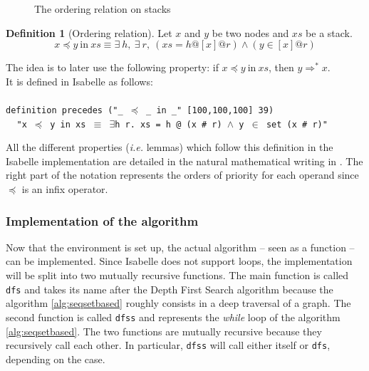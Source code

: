 \documentclass[a4 paper, 12pt]{article}
\newcommand{\where}{{\color{isa_green}{where}}}
\newcommand{\isa}[1]{\small\texttt{\\\noindent#1}}
\theoremstyle{definition}
\newtheorem{definition}{Definition}
\begin{document}
\begin{figure}[!h]
    \caption{The ordering relation on stacks\label{fig:stackorder}}
\end{figure}

\begin{definition}[Ordering relation]
    Let $x$ and $y$ be two nodes and $xs$ be a stack.
    \begin{equation*}
        x \preceq y~\text{in}~xs \equiv \exists~h,~\exists~r,~(xs = h @ [x] @ r) \wedge (y \in [x]@r)
    \end{equation*}
\end{definition}


The idea is to later use the following property: if $x \preceq y~\text{in}~xs$, then $y \Rightarrow^* x$.\\
It is defined in Isabelle as follows:\\
\isa{
    {\color{isa_blue}definition} precedes ("\_ $\preceq$ \_ in \_" [100,100,100] 39) \where\\
$~~~~~$"{\color{isa_dark_green}x} $\preceq$ {\color{isa_dark_green}y} in {\color{isa_dark_green}xs} $\equiv$ $\exists${\color{isa_dark_green}h} {\color{isa_dark_green}r}. {\color{isa_dark_green}xs} = {\color{isa_dark_green}h} @ ({\color{isa_dark_green}x} \# {\color{isa_dark_green}r}) $\wedge$ {\color{isa_dark_green}y} $\in$ set ({\color{isa_dark_green}x} \# {\color{isa_dark_green}r})"\\
}

All the different properties (\textit{i.e.} lemmas) which follow this definition in the Isabelle implementation are detailed in the natural mathematical writing in . The right part of the notation represents the orders of priority for each operand since $\preceq$ is an infix operator.

\subsubsection{Implementation of the algorithm}

Now that the environment is set up, the actual algorithm -- seen as a function -- can be implemented.
Since Isabelle does not support loops, the implementation will be split into two mutually recursive functions. The main function is called \texttt{dfs} and takes its name after the Depth First Search algorithm because the algorithm \ref{alg:seqsetbased} roughly consists in a deep traversal of a graph. The second function is called \texttt{dfss} and represents the \textit{while} loop of the algorithm \ref{alg:seqsetbased}. The two functions are mutually recursive because they recursively call each other. In particular, \texttt{dfss} will call either itself or \texttt{dfs}, depending on the case.
\end{document}
